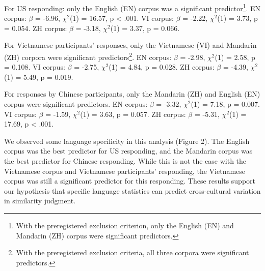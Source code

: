 \documentclass[10pt, letterpaper]{article}
\begin{document}
For US responding: only the English (EN) corpus was a significant
predictor\footnote{With the preregistered exclusion criterion, only the
  English (EN) and Mandarin (ZH) corpus were significant predictors.}.
EN corpus: \(\beta\) = -6.96, \(\chi^2\)(1) = 16.57, p \textless{} .001.
VI corpus: \(\beta\) = -2.22, \(\chi^2\)(1) = 3.73, p = 0.054. ZH
corpus: \(\beta\) = -3.18, \(\chi^2\)(1) = 3.37, p = 0.066.

For Vietnamese participants' responses, only the Vietnamese (VI) and
Mandarin (ZH) corpora were significant predictors\footnote{With the
  preregistered exclusion criteria, all three corpora were significant
  predictors.}. EN corpus: \(\beta\) = -2.98, \(\chi^2\)(1) = 2.58, p =
0.108. VI corpus: \(\beta\) = -2.75, \(\chi^2\)(1) = 4.84, p = 0.028. ZH
corpus: \(\beta\) = -4.39, \(\chi^2\)(1) = 5.49, p = 0.019.

For responses by Chinese participants, only the Mandarin (ZH) and
English (EN) corpus were significant predictors. EN corpus: \(\beta\) =
-3.32, \(\chi^2\)(1) = 7.18, p = 0.007. VI corpus: \(\beta\) = -1.59,
\(\chi^2\)(1) = 3.63, p = 0.057. ZH corpus: \(\beta\) = -5.31,
\(\chi^2\)(1) = 17.69, p \textless{} .001.

We observed some language specificity in this analysis (Figure 2). The
English corpus was the best predictor for US responding, and the
Mandarin corpus was the best predictor for Chinese responding. While
this is not the case with the Vietnamese corpus and Vietnamese
participants' responding, the Vietnamese corpus was still a significant
predictor for this responding. These results support our hypothesis that
specific language statistics can predict cross-cultural variation in
similarity judgment.
\end{document}
